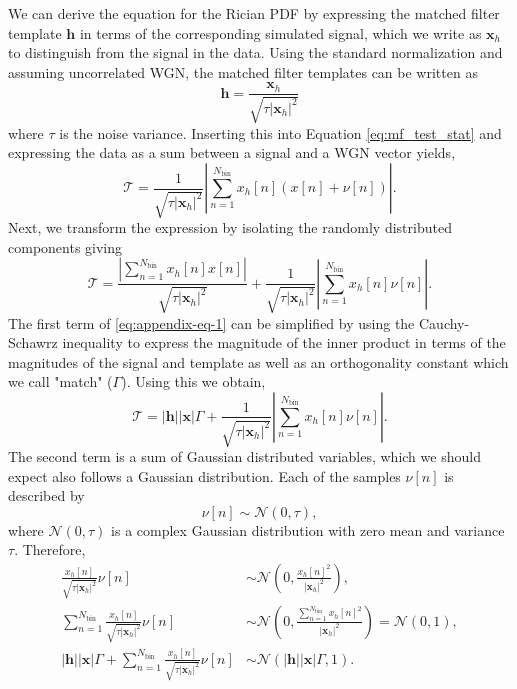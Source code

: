 We can derive the equation for the Rician PDF by expressing the matched filter template $\mathbf{h}$ in terms of the corresponding simulated signal, which we write as $\mathbf{x}_h$ to distinguish from the signal in the data. Using the standard normalization and assuming uncorrelated WGN, the matched filter templates can be written as
\begin{equation}
    \mathbf{h}=\frac{\mathbf{x}_h}{\sqrt{\tau|\mathbf{x}_h|^2}}
\end{equation}
where $\tau$ is the noise variance. Inserting this into Equation \ref{eq:mf_test_stat} and expressing the data as a sum between a signal and a WGN vector yields,
\begin{equation}
    \mathcal{T}=\frac{1}{\sqrt{\tau|\mathbf{x}_h|^2}}\left|\sum_{n=1}^{N_\mathrm{bin}}{x_h[n]\left(x[n]+\nu[n]\right)}\right|.
\end{equation}
Next, we transform the expression by isolating the randomly distributed components giving
\begin{equation}
    \mathcal{T}=\frac{\left|\sum_{n=1}^{N_\mathrm{bin}}{x_h[n]x[n]}\right|}{\sqrt{\tau|\mathbf{x}_h|^2}}+\frac{1}{\sqrt{\tau|\mathbf{x}_h|^2}}\left|\sum_{n=1}^{N_\mathrm{bin}}{x_h[n]\nu[n]}\right|.
    \label{eq:appendix-eq-1}
\end{equation}
The first term of \ref{eq:appendix-eq-1} can be simplified by using the Cauchy-Schawrz inequality to express the magnitude of the inner product in terms of the magnitudes of the signal and template as well as an orthogonality constant which we call "match" ($\Gamma$). Using this we obtain,
\begin{equation}
    \mathcal{T}=|\mathbf{h}||\mathbf{x}|\Gamma+\frac{1}{\sqrt{\tau|\mathbf{x}_h|^2}}\left|\sum_{n=1}^{N_\mathrm{bin}}{x_h[n]\nu[n]}\right|.
\end{equation}
The second term is a sum of Gaussian distributed variables, which we should expect also follows a Gaussian distribution. Each of the samples $\nu[n]$ is described by
\begin{equation}
    \nu[n]\sim \mathcal{N}(0,\tau),
\end{equation}
where $\mathcal{N}(0, \tau)$ is a complex Gaussian distribution with zero mean and variance $\tau$. Therefore,
\begin{align}
    \frac{x_h[n]}{\sqrt{\tau|\mathbf{x}_h|^2}}\nu[n]&\sim\mathcal{N}\left(0,\frac{x_h[n]^2}{|\mathbf{x}_h|^2}\right),\\
    \sum_{n=1}^{N_\mathrm{bin}}{\frac{x_h[n]}{\sqrt{\tau|\mathbf{x}_h|^2}}\nu[n]}&\sim\mathcal{N}\left(0,\frac{\sum_{n=1}^{N_\mathrm{bin}}{x_h[n]^2}}{|\mathbf{x}_h|^2}\right)=\mathcal{N}(0,1),\\
    |\mathbf{h}||\mathbf{x}|\Gamma+\sum_{n=1}^{N_\mathrm{bin}}{\frac{x_h[n]}{\sqrt{\tau|\mathbf{x}_h|^2}}\nu[n]}&\sim\mathcal{N}(|\mathbf{h}||\mathbf{x}|\Gamma,1).
\end{align}
